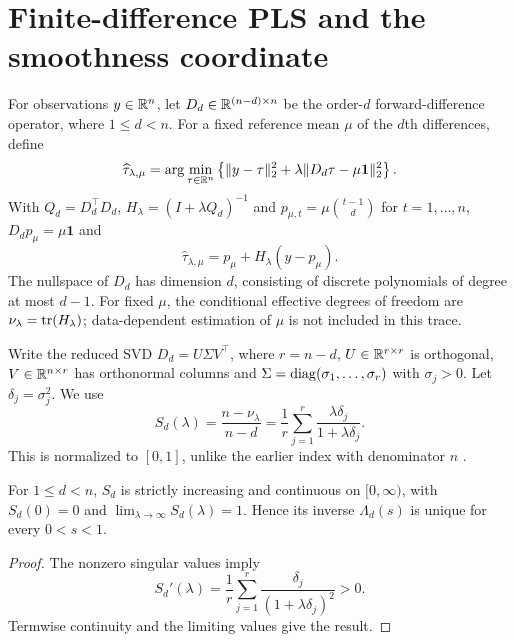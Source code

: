\section{Finite-difference PLS and the smoothness coordinate}\label{sec:theory}
For observations $y\in\mathbb{R}^n$, let $D_d\in\mathbb{R}^{(n-d)\times n}$ be the order-$d$ forward-difference operator, where $1\le d<n$. For a fixed reference mean $\mu$ of the $d$th differences, define
\begin{equation}\label{eq:pls}
\widehat\tau_{\lambda,\mu}
=\arg\min_{\tau\in\mathbb{R}^n}\left\{
\|y-\tau\|_2^2+\lambda\|D_d\tau-\mu\mathbf1\|_2^2\right\}.
\end{equation}
With $Q_d=D_d^\top D_d$, $H_\lambda=(I+\lambda Q_d)^{-1}$ and $p_{\mu,t}=\mu\binom{t-1}{d}$ for $t=1,\ldots,n$, $D_dp_\mu=\mu\mathbf1$ and
\begin{equation}\label{eq:affine}
\widehat\tau_{\lambda,\mu}=p_\mu+H_\lambda(y-p_\mu).
\end{equation}
The nullspace of $D_d$ has dimension $d$, consisting of discrete polynomials of degree at most $d-1$. For fixed $\mu$, the conditional effective degrees of freedom are $\nu_\lambda=\operatorname{tr}(H_\lambda)$; data-dependent estimation of $\mu$ is not included in this trace.

Write the reduced SVD $D_d=U\Sigma V^\top$, where $r=n-d$, $U\in\mathbb{R}^{r\times r}$ is orthogonal, $V\in\mathbb{R}^{n\times r}$ has orthonormal columns and $\Sigma=\operatorname{diag}(\sigma_1,\ldots,\sigma_r)$ with $\sigma_j>0$. Let $\delta_j=\sigma_j^2$. We use
\begin{equation}\label{eq:s}
S_d(\lambda)=\frac{n-\nu_\lambda}{n-d}
=\frac1r\sum_{j=1}^{r}\frac{\lambda\delta_j}{1+\lambda\delta_j}.
\end{equation}
This is normalized to $[0,1]$, unlike the earlier index with denominator $n$ \citep{guerrero2008,cortes2017}.

\begin{proposition}\label{prop:map}
For $1\le d<n$, $S_d$ is strictly increasing and continuous on $[0,\infty)$, with $S_d(0)=0$ and $\lim_{\lambda\to\infty}S_d(\lambda)=1$. Hence its inverse $\Lambda_d(s)$ is unique for every $0<s<1$.
\end{proposition}
\begin{proof}
The nonzero singular values imply
\[
S_d'(\lambda)=\frac1r\sum_{j=1}^{r}
\frac{\delta_j}{(1+\lambda\delta_j)^2}>0.
\]
Termwise continuity and the limiting values give the result.
\end{proof}

